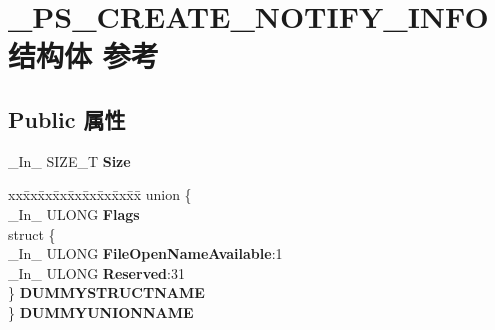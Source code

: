 \hypertarget{struct___p_s___c_r_e_a_t_e___n_o_t_i_f_y___i_n_f_o}{}\section{\+\_\+\+P\+S\+\_\+\+C\+R\+E\+A\+T\+E\+\_\+\+N\+O\+T\+I\+F\+Y\+\_\+\+I\+N\+F\+O结构体 参考}
\label{struct___p_s___c_r_e_a_t_e___n_o_t_i_f_y___i_n_f_o}
\subsection*{Public 属性}
\begin{DoxyCompactItemize}
\item 
\mbox{\label{struct___p_s___c_r_e_a_t_e___n_o_t_i_f_y___i_n_f_o_a176d45ae37328d65a32cc2c033536548}} 
\+\_\+\+In\+\_\+ S\+I\+Z\+E\+\_\+T {\bfseries Size}
\item 
\mbox{\label{struct___p_s___c_r_e_a_t_e___n_o_t_i_f_y___i_n_f_o_a24b7d35135e3fa6f2e900e20b10abe5f}} 
\begin{tabbing}
xx\=xx\=xx\=xx\=xx\=xx\=xx\=xx\=xx\=\kill
union \{\\
\>\_In\_ ULONG {\bfseries Flags}\\
\>struct \{\\
\>\>\_In\_ ULONG {\bfseries FileOpenNameAvailable}:1\\
\>\>\_In\_ ULONG {\bfseries Reserved}:31\\
\>\} {\bfseries DUMMYSTRUCTNAME}\\
\} {\bfseries DUMMYUNIONNAME}\\


\end{tabbing}
\end{DoxyCompactItemize}
